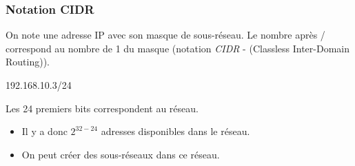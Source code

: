 \documentclass[svgnames,11pt]{beamer}
\begin{document}
\begin{frame}
    \frametitle{Notation CIDR}

    \begin{aretenir}[]
        On note une adresse IP avec son masque de sous-réseau. Le nombre après / correspond au nombre de 1 du masque (notation \emph{CIDR} - (Classless Inter-Domain Routing)).
        \begin{center}
            192.168.10.3/24
        \end{center}
        Les 24 premiers bits correspondent au réseau.
    \end{aretenir}
    \begin{itemize}
        \item Il y a donc $2^{32-24}$ adresses disponibles dans le réseau.
        \item On peut créer des sous-réseaux dans ce réseau.
    \end{itemize}
\end{frame}
\end{document}
